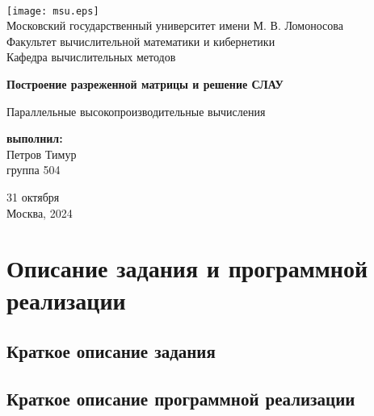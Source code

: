 \documentclass[12pt, a4paper]{article}
\begin{document}
	
\thispagestyle{empty}

\begin{center}
	\ \vspace{-3cm}
	
	\texttt{[image: msu.eps]}\\
	{Московский государственный университет имени М. В. Ломоносова}\\
	Факультет вычислительной математики и кибернетики\\
	Кафедра вычислительных методов
	
	\vspace{6cm}
	
	{\Large \bfseries Построение разреженной матрицы и решение СЛАУ}
	
	\vspace{1cm}
	
	{\large Параллельные высокопроизводительные вычисления}
\end{center}

\vfill

\begin{flushright}
	\textbf{выполнил:}\\
	Петров Тимур \\
	группа 504
\end{flushright}

\vfill

\begin{center}
	31 октября \\
	Москва, 2024
\end{center}

\enlargethispage{2\baselineskip}

\newpage

\tableofcontents

\newpage

\section{Описание задания и программной реализации}

\subsection{Краткое описание задания}

\subsection{Краткое описание программной реализации}
\end{document}

